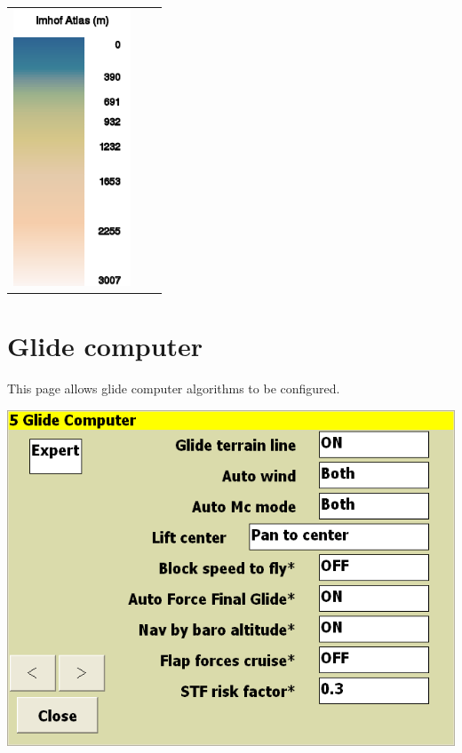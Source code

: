 \documentclass[a4paper,12pt]{refrep}
\begin{document}
\begin{maxipage}
\begin{longtable}{c c c}
\includegraphics[angle=0,width=3.5cm,keepaspectratio='true']{figures/ramp-terrain-imhofatlas.png}& & \\

\end{longtable}
\end{maxipage}


\clearpage
\section{Glide computer}\label{sec:final-glide}

This page allows glide computer algorithms to be configured.

\begin{center}
\includegraphics[angle=0,width=\linewidth,keepaspectratio='true']{figures/config-3.png}
\end{center}
\end{document}
